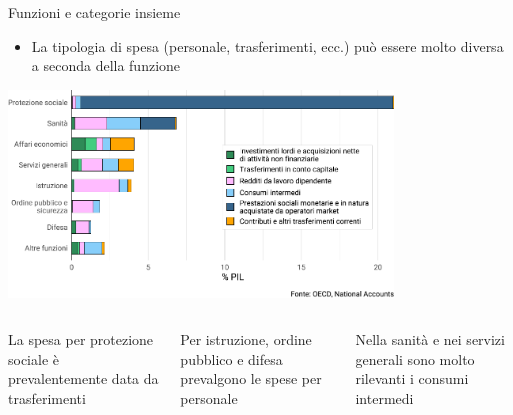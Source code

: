 \documentclass[11pt,italian]{beamer}
\begin{document}
\begin{frame}{Funzioni e categorie insieme}
\begin{itemize}
\item La tipologia di spesa (personale, trasferimenti, ecc.) può essere molto diversa a seconda della funzione
\end{itemize}

\begin{center}
\includegraphics[height=5.5cm]{./figure/spesa-primaria-funzioni-categorie-ITA-color.pdf}
\end{center}

\begin{columns}
\begin{column}{.33\columnwidth}
\begin{block}{}
\footnotesize
La spesa per protezione sociale è prevalentemente data da trasferimenti
\end{block}
\end{column}

\begin{column}{.33\columnwidth}
\begin{block}{}
\footnotesize
Per istruzione, ordine pubblico e difesa prevalgono le spese per personale
\end{block}
\end{column}

\begin{column}{.33\columnwidth}
\begin{block}{}
\footnotesize
Nella sanità e nei servizi generali sono molto rilevanti i consumi intermedi
\end{block}
\end{column}
\end{columns}
\end{frame}
\end{document}
